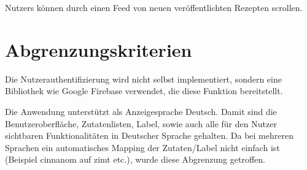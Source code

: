 \glspl{Nutzer} können durch einen \gls{Feed} von neuen veröffentlichten Rezepten scrollen.



\section{Abgrenzungskriterien}

	Die Nutzerauthentifizierung wird nicht selbst implementiert, sondern eine Bibliothek wie Google Firebase verwendet, die diese Funktion bereitstellt. 

Die Anwendung unterstützt als Anzeigesprache Deutsch. Damit sind die Benutzeroberfläche, Zutatenlisten, Label, sowie auch alle für den \gls{Nutzer} sichtbaren Funktionalitäten in Deutscher Sprache gehalten. Da bei mehreren Sprachen ein automatisches Mapping der Zutaten/Label nicht einfach ist (Beispiel cinnanom auf zimt etc.), wurde diese Abgrenzung getroffen. 




